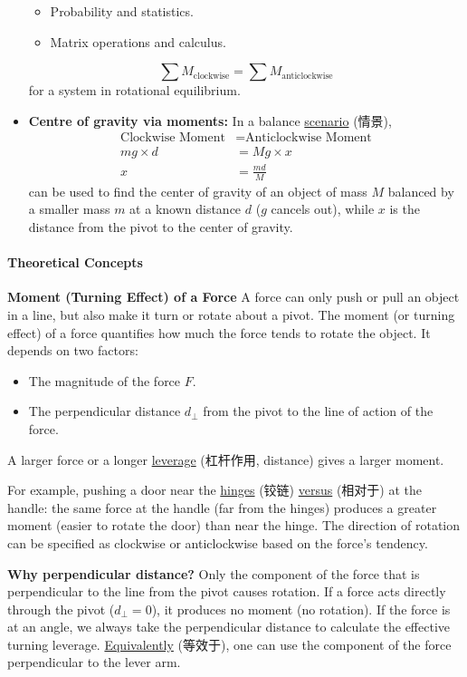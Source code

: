\begin{itemize}
{\begin{itemize}
\begin{itemize}
\begin{itemize}
                \item Probability and statistics.
                \item Matrix operations and calculus.
            \end{itemize}
        \end{itemize}
    \end{itemize}}
    \begin{equation}
        \sum M_{\text{clockwise}} = \sum M_{\text{anticlockwise}}
    \end{equation}
    for a system in rotational equilibrium.
    \item \textbf{Centre of gravity via moments:} In a balance \underline{scenario} (情景),
    \begin{equation}
        \begin{split}
            \text{Clockwise Moment} &= \text{Anticlockwise Moment} \\
            mg \times d &= Mg \times x \\
            x &= \frac{md}{M}
        \end{split}
    \end{equation}
    can be used to find the center of gravity of an object of mass $M$ balanced by a smaller mass $m$ at a known distance $d$
    ($g$ cancels out), while $x$ is the distance from the pivot to the center of gravity.
\end{itemize}

\paragraph{Theoretical Concepts}
\textbf{Moment (Turning Effect) of a Force}
A force can only push or pull an object in a line, but also make it turn or rotate about a pivot. The moment (or turning effect)
of a force quantifies how much the force tends to rotate the object. It depends on two factors:
\begin{itemize}
    \item The magnitude of the force $F$.
    \item The perpendicular distance $d_{\perp}$ from the pivot to the line of action of the force.
\end{itemize}
A larger force or a longer \underline{leverage} (杠杆作用, distance) gives a larger moment. \par
For example, pushing a door near the \underline{hinges} (铰链) \underline{versus} (相对于) at the handle: the same force at the
handle (far from the hinges) produces a greater moment (easier to rotate the door) than near the hinge. The direction of rotation
can be specified as clockwise or anticlockwise based on the force's tendency. \par
\textbf{Why perpendicular distance?} Only the component of the force that is perpendicular to the line from the pivot causes
rotation. If a force acts directly through the pivot ($d_{\perp} = 0$), it produces no moment (no rotation). If the force is at
an angle, we always take the perpendicular distance to calculate the effective turning leverage. \underline{Equivalently} (等效于),
one can use the component of the force perpendicular to the lever arm.

